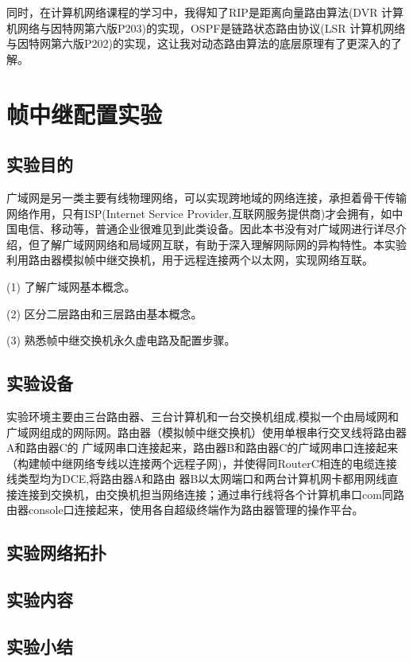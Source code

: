 \documentclass[lang=cn,11pt,a4paper,cite=authoryear]{elegantpaper}
\begin{document}
同时，在计算机网络课程的学习中，我得知了RIP是距离向量路由算法(DVR 计算机网络与因特网第六版P203)的实现，OSPF是链路状态路由协议(LSR 计算机网络与因特网第六版P202)的实现，这让我对动态路由算法的底层原理有了更深入的了解。

\section{帧中继配置实验}
\subsection{实验目的}

广域网是另一类主要有线物理网络，可以实现跨地域的网络连接，承担着骨干传输网络作用，只有ISP(Internet Service Provider,互联网服务提供商)才会拥有，如中国电信、移动等，普通企业很难见到此类设备。因此本书没有对广域网进行详尽介绍，但了解广域网网络和局域网互联，有助于深入理解网际网的异构特性。本实验利用路由器模拟帧中继交换机，用于远程连接两个以太网，实现网络互联。

(1)	了解广域网基本概念。

(2)	区分二层路由和三层路由基本概念。

(3)	熟悉帧中继交换机永久虚电路及配置步骤。

\subsection{实验设备}

实验环境主要由三台路由器、三台计算机和一台交换机组成,模拟一个由局域网和广域网组成的网际网。路由器（模拟帧中继交换机）使用单根串行交叉线将路由器A和路由器C的 广域网串口连接起来，路由器B和路由器C的广域网串口连接起来（构建帧中继网络专线以连接两个远程子网)，并使得同RouterC相连的电缆连接线类型均为DCE,将路由器A和路由 器B以太网端口和两台计算机网卡都用网线直接连接到交换机，由交换机担当网络连接；通过串行线将各个计算机串口com同路由器console口连接起来，使用各自超级终端作为路由器管理的操作平台。

\subsection{实验网络拓扑}



\subsection{实验内容}
\subsection{实验小结}
\end{document}
